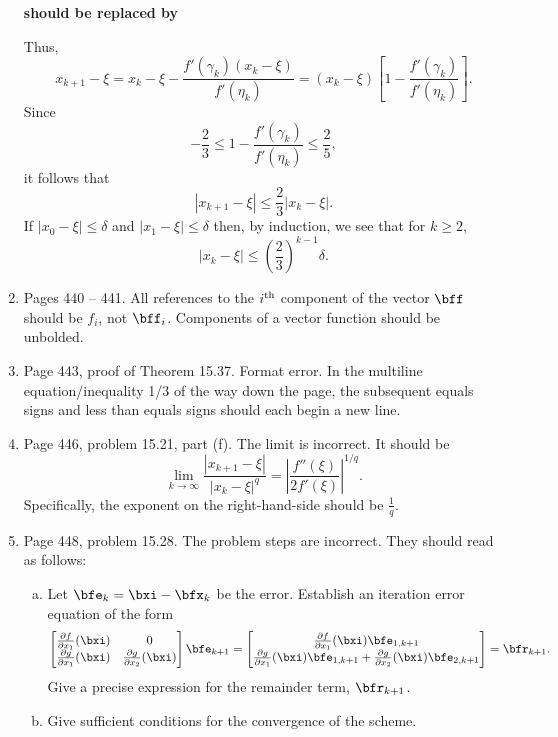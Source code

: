 \documentclass{book}
\begin{document}
\begin{enumerate}
	\medskip

\textbf{should be replaced by}

	\medskip
	
Thus,
	\[
x_{k+1} -\xi = x_k - \xi -\frac{f'(\gamma_k) (x_k-\xi)}{f'(\eta_k)} = (x_k-\xi)\left[1 - \frac{f'(\gamma_k)}{f'(\eta_k)}\right] .
	\]
Since
	\[
-\frac{2}{3} \le 1 - \frac{f'(\gamma_k)}{f'(\eta_k)} \le \frac{2}{5} ,
	\]
it follows that
	\[
|x_{k+1} -\xi| \le \frac{2}{3} |x_k - \xi|.
	\]
If $|x_0-\xi| \le \delta$ and $|x_1-\xi| \le \delta$ then, by induction, we see that for $k\ge 2$,
	\[
|x_k-\xi| \le \left( \frac{2}{3}\right)^{k-1} \delta .
	\]

	\medskip
	
	
	\item
Pages 440 -- 441. All references to the $i^{\rm th}$ component of the vector $\bff$ should be $f_i$, not $\bff_i$. Components of a vector function should be unbolded.

	\item
Page 443, proof of Theorem 15.37. Format error. In the  multiline equation/inequality 1/3 of the way down the page, the subsequent equals signs and less than equals signs should each begin a new line. 

	\item
Page 446, problem 15.21, part (f). The limit is incorrect. It should be
	\[
\lim_{k\to\infty} \frac{|x_{k+1}-\xi|}{|x_k-\xi|^q} = \left| \frac{f''(\xi)}{2f'(\xi)} \right|^{1/q}.	
	\]
Specifically, the exponent on the right-hand-side should be $\frac{1}{q}$.

	\item
Page 448, problem 15.28. The problem steps are incorrect. They should read as follows:

  \begin{enumerate}[a)]
    \item Let $\bfe_k = \bxi - \bfx_k$ be the error. Establish an iteration error equation of the form
    \[
      \begin{bmatrix}
        \frac{\partial f}{\partial x_1}(\bxi) & 0 
 \\
        \frac{\partial g}{\partial x_1}(\bxi) & \frac{\partial g}{\partial x_2}(\bxi)
      \end{bmatrix}
      \bfe_{k+1} =
      \begin{bmatrix}
        \frac{\partial f}{\partial x_1}(\bxi) \bfe_{1,k+1}   \\
        \frac{\partial g}{\partial x_1}(\bxi) \bfe_{1,k+1} + \frac{\partial g}{\partial x_2}(\bxi) \bfe_{2,k+1} 
      \end{bmatrix}
      = \bfr_{k+1}.
    \]
    Give a precise expression for the remainder term, $\bfr_{k+1}$.
    
    \item Give sufficient conditions for the convergence of the scheme.
  \end{enumerate}


	\end{enumerate}
	
\end{document}
